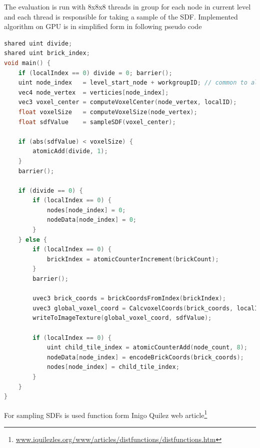 \documentclass[11pt, a4paper]{article}
\begin{document}
The evaluation is run with 8x8x8 threads in group for each node in current level and each thread is responsible for taking a sample of the SDF.
Implemented algorithm on GPU is in simplified form in following pseudo code
\begin{lstlisting}[language=C++]
shared uint divide;
shared uint brick_index;
void main() {
    if (localIndex == 0) divide = 0; barrier();
    uint node_index   = level_start_node + workgroupID; // common to all voxels
    vec4 node_vertex  = verticies[node_index];
    vec3 voxel_center = computeVoxelCenter(node_vertex, localID);
    float voxelSize   = computeVoxelSize(node_vertex);
    float sdfValue    = sampleSDF(voxel_center);
    
    if (abs(sdfValue) < voxelSize) {
        atomicAdd(divide, 1);
    }
    barrier();
    
    if (divide == 0) {
        if (localIndex == 0) {
            nodes[node_index] = 0;
            nodeData[node_index] = 0;
        }
    } else {
        if (localIndex == 0) {
            brickIndex = atomicCounterIncrement(brickCount);
        }
        barrier();
        
        uvec3 brick_coords = brickCoordsFromIndex(brickIndex);
        uvec3 global_voxel_coord = CalcvoxelCoords(brick_coords, localID);
        writeToImageTexture(global_voxel_coord, sdfValue);
        
        if (localIndex == 0) {
            uint child_tile_index = atomicCounterAdd(node_count, 8);
            nodeData[node_index] = encodeBrickCoords(brick_coords);
            nodes[node_index] = child_tile_index;
        }
    }
}
\end{lstlisting}
For sampling SDFs is used function form Inigo Quilez web article\footnote{\href{https://iquilezles.org/www/articles/distfunctions/distfunctions.htm}{www.iquilezles.org/www/articles/distfunctions/distfunctions.htm}}
\end{document}
